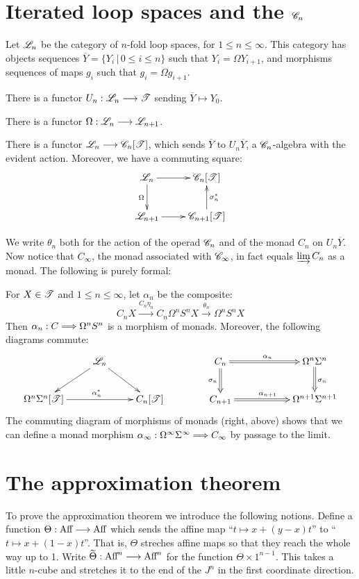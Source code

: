 \documentclass[11pt]{article}
\newcommand{\Aff}{\textup{Aff}}
\begin{document}
\begin{chapter4-6}
\section{Iterated loop spaces and the \texorpdfstring{$\mathscr{C}_n$}{Cn}}
Let $\mathscr{L}_n$ be the category of $n$-fold loop spaces, for $1\leq n\leq\infty$. This category has objects sequences $\overline{Y}=\{Y_i\,|\,0\leq i\leq n\}$ such that $Y_i=\Omega Y_{i+1}$, and morphisms sequences of maps $g_i$ such that $g_i=\Omega g_{i+1}$.
\begin{itemise}
\item There is a functor $U_n:\mathscr{L}_n\longrightarrow\mathscr{T}$ sending $\overline{Y}\mapsto Y_0$.
\item  There is a functor $\Omega:\mathscr{L}_n\longrightarrow\mathscr{L}_{n+1}$.
\end{itemise}
\begin{thm*}[5.1]
There is a functor $\mathscr{L}_n\longrightarrow\mathscr{C}_n[\mathscr{T}]$, which sends $\overline{Y}$ to $U_n\overline{Y}$, a $\mathscr{C}_n$-algebra with the evident action. Moreover, we have a commuting square:
\[\xymatrix{
\scrL_n\ar[r]\ar[d]_\Omega&\scrC_n[\scrT]\ar[d];[]_{\sigma_n^*}\\
\scrL_{n+1}\ar[r]&\scrC_{n+1}[\scrT]
}\]
\end{thm*}
We write $\theta_n$ both for the action of the operad $\mathscr{C}_n$ and of the monad $C_n$ on $U_n\overline{Y}$. Now notice that $C_\infty$, the monad associated with $\mathscr{C}_\infty$, in fact equals $\varinjlim C_n$ as a monad. The following is purely formal:
\begin{thm*}[5.2]
For $X\in\mathscr{T}$ and $1\leq n\leq\infty$, let $\alpha_n$ be the composite:
\[C_nX\overset{C_n\eta_n}{\to}C_n\Omega^nS^nX\overset{\theta_n}{\to}\Omega^nS^nX\]
Then $\alpha_n:C\Longrightarrow \Omega^n S^n$ is a morphism of monads. Moreover, the following diagrams commute:
\[\xymatrix{
&\scrL_n\ar[ld]\ar[rd]\\
\Omega^n\Sigma^n[\scrT]\ar[rr]^{\alpha_n^*}&&C_n[\scrT]
}\qquad\qquad\xymatrix@C=2cm{
C_n\ar@{=>}[d]_{\sigma_n}\ar@{=>}[r]^{\alpha_n}&\Omega^{n}\Sigma^{n}\ar@{=>}[d]^{\sigma_n}\\
C_{n+1}\ar@{=>}[r]^{\alpha_{n+1}}&\Omega^{n+1}\Sigma^{n+1}
}\]
The commuting diagram of morphisms of monads (right, above) shows that we can define a monad morphism $\alpha_\infty:\Omega^\infty\Sigma^\infty\Longrightarrow C_\infty$ by passage to the limit.
\end{thm*}
\section{The approximation theorem}
To prove the approximation theorem we introduce the following notions. Define a function $\Theta:\Aff\to\Aff$ which sends the affine map ``$t\mapsto x+(y-x)t$'' to 
``$t\mapsto x+(1-x)t$''. That is, $\Theta$ streches affine maps so that they reach the whole way up to 1. Write $\widetilde{\Theta}:\Aff^n\to\Aff^n$ for the function $\Theta\times1^{n-1}$. This takes a little $n$-cube and stretches it to the end of the $J^n$ in the first coordinate direction.


\end{chapter4-6}
\end{document}
